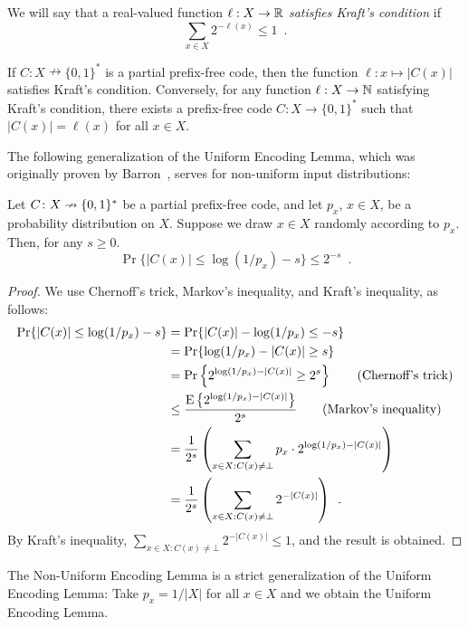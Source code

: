 \documentclass{patmorin}
\begin{document}
We will say that a real-valued function $\ell : X \to \mathbb{R}$
\emph{satisfies Kraft's condition} if
\[
  \sum_{x \in X} 2^{-\ell(x)} \leq 1 \enspace .
\]
\begin{lem}
  If $C : X \nrightarrow \{0,1\}^*$ is a partial prefix-free code,
  then the function  $\ell : x \mapsto |C(x)|$ satisfies Kraft's condition. Conversely, for any
  function $\ell : X \to \mathbb{N}$ satisfying Kraft's condition, there
  exists a prefix-free code $C : X \to \{0, 1\}^*$ such that
  $|C(x)| = \ell(x)$ for all $x \in X$.
\end{lem}

The following generalization of the Uniform Encoding Lemma, which was
originally proven by Barron~\cite[Theorem~3.1]{barron:dissertation},
serves for non-uniform input distributions:
\begin{lem}  
  Let $C\colon X\nrightarrow\{0,1\}^*$ be a partial prefix-free code,
  and let $p_x$, $x \in X$, be a probability distribution on $X$.
  Suppose we draw $x \in X$ randomly according to $p_x$.
  Then, for any $s \geq 0$.
  \[
    \Pr\{ |C(x)| \le \log(1/p_x)-s\} \le 2^{-s} \enspace .
  \]
\end{lem}

\begin{proof}
  We use Chernoff's trick, Markov's inequality, and Kraft's
  inequality, as follows:
  \begin{align*}
    \Pr\{ |C(x)| \le\log(1/p_x)-s \}
    & = \Pr\{|C(x)| -\log(1/p_x) \le -s \} \\
    & = \Pr\{\log(1/p_x)-|C(x)| \ge s \} \\
    & = \Pr\left\{2^{\log(1/p_x)-|C(x)|} \ge 2^s \right\}  \tag{Chernoff's trick} \\
    & \le \frac{\operatorname{\mathrm{E}}\left\{2^{\log(1/p_x)-|C(x)|}\right\}}{2^s} \tag{Markov's inequality} \\
    & = \frac{1}{2^s} \left(\sum_{x\in X : C(x) \neq \bot} p_x\cdot 2^{\log(1/p_x)-|C(x)|}\right) \\
    & = \frac{1}{2^s} \left(\sum_{x\in X : C(x) \neq \bot }2^{-|C(x)|}\right) \enspace .
  \end{align*}
  By Kraft's inequality,
  $\sum_{x \in X : C(x) \neq \bot} 2^{-|C(x)|} \leq 1$, and the result
  is obtained.
\end{proof}

The Non-Uniform Encoding Lemma is a strict generalization
of the Uniform Encoding Lemma: Take $p_x=1/|X|$ for all $x\in X$ and
we obtain the Uniform Encoding Lemma.
\end{document}
